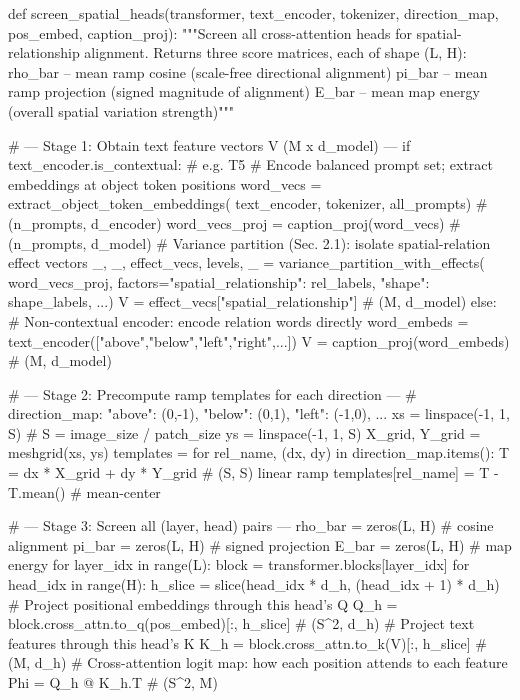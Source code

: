 \begin{RoundedListing}
def screen_spatial_heads(transformer, text_encoder, tokenizer,
                         direction_map, pos_embed, caption_proj):
    """Screen all cross-attention heads for spatial-relationship alignment.
    Returns three score matrices, each of shape (L, H):
      rho_bar  -- mean ramp cosine  (scale-free directional alignment)
      pi_bar   -- mean ramp projection (signed magnitude of alignment)
      E_bar    -- mean map energy   (overall spatial variation strength)"""

    # --- Stage 1: Obtain text feature vectors V (M x d_model) ---
    if text_encoder.is_contextual:  # e.g. T5
        # Encode balanced prompt set; extract embeddings at object token positions
        word_vecs = extract_object_token_embeddings(
            text_encoder, tokenizer, all_prompts)   # (n_prompts, d_encoder)
        word_vecs_proj = caption_proj(word_vecs)     # (n_prompts, d_model)
        # Variance partition (Sec. 2.1): isolate spatial-relation effect vectors
        _, _, effect_vecs, levels, _ = variance_partition_with_effects(
            word_vecs_proj,
            factors={"spatial_relationship": rel_labels,
                     "shape": shape_labels, ...})
        V = effect_vecs["spatial_relationship"]      # (M, d_model)
    else:
        # Non-contextual encoder: encode relation words directly
        word_embeds = text_encoder(["above","below","left","right",...])
        V = caption_proj(word_embeds)                # (M, d_model)

    # --- Stage 2: Precompute ramp templates for each direction ---
    # direction_map: {"above": (0,-1), "below": (0,1), "left": (-1,0), ...}
    xs = linspace(-1, 1, S)  # S = image_size / patch_size
    ys = linspace(-1, 1, S)
    X_grid, Y_grid = meshgrid(xs, ys)
    templates = {}
    for rel_name, (dx, dy) in direction_map.items():
        T = dx * X_grid + dy * Y_grid   # (S, S) linear ramp
        templates[rel_name] = T - T.mean()  # mean-center

    # --- Stage 3: Screen all (layer, head) pairs ---
    rho_bar = zeros(L, H)   # cosine alignment
    pi_bar  = zeros(L, H)   # signed projection
    E_bar   = zeros(L, H)   # map energy
    for layer_idx in range(L):
        block = transformer.blocks[layer_idx]
        for head_idx in range(H):
            h_slice = slice(head_idx * d_h, (head_idx + 1) * d_h)
            # Project positional embeddings through this head's Q
            Q_h = block.cross_attn.to_q(pos_embed)[:, h_slice]  # (S^2, d_h)
            # Project text features through this head's K
            K_h = block.cross_attn.to_k(V)[:, h_slice]          # (M, d_h)
            # Cross-attention logit map: how each position attends to each feature
            Phi = Q_h @ K_h.T                                   # (S^2, M)


\end{RoundedListing}
